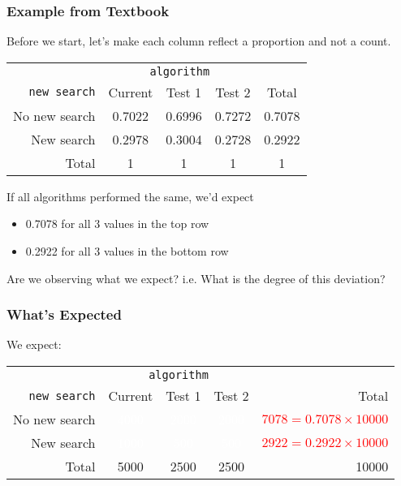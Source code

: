 \documentclass[handout]{beamer}
\newcommand{\blue}[1]{\textcolor{blue2}{#1}}
\newcommand{\white}[1]{\textcolor{white}{#1}}
\newcommand{\red}[1]{\textcolor{red}{#1}}
\begin{document}
\begin{frame}
\frametitle{Example from Textbook}

Before we start, let's make each column reflect a proportion and not a count. \pause
\begin{center}
  \begin{tabular}{r|ccc|c}
& \multicolumn{3}{c|}{{\tt algorithm}} & \\
       {\tt new search} & Current & Test 1 & Test 2 & Total \\ 
\hline
    No new search & 0.7022 & 0.6996 & 0.7272 & 0.7078 \\ 
    New search & 0.2978 & 0.3004 & 0.2728 & 0.2922 \\ 
\hline
    Total & 1 & 1 & 1 & 1 \\ 
  \end{tabular}
\end{center}

\pause
If all algorithms performed the same, we'd \blue{expect}
\begin{itemize}
\item \blue{0.7078} for all 3 values in the top row
\item \blue{0.2922} for all 3 values in the bottom row
\end{itemize}

\pause Are we observing what we expect? i.e. What is the degree of this deviation?
\end{frame}


\begin{frame}
\frametitle{What's Expected}

We expect:
\begin{center}
  \begin{tabular}{r|ccc|r}
& \multicolumn{3}{c|}{{\tt algorithm}} & \\
       {\tt new search} & Current & Test 1 & Test 2 & Total \\ 
\hline
    No new search & \white{4000} & \white{2000} & \white{2000} & \red{$7078 = 0.7078 \times 10000$} \\ 
    New search & \white{1000} & \white{500} & \white{500} & \red{$2922 = 0.2922 \times 10000$} \\ 
\hline
    Total & 5000 & 2500 & 2500 & 10000 \\ 
  \end{tabular}
\end{center}


\end{frame}
\end{document}
